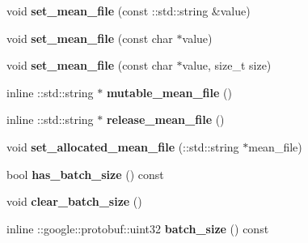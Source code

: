 \begin{DoxyCompactItemize}
void {\bfseries set\+\_\+mean\+\_\+file} (const \+::std\+::string \&value)
\item 
\mbox{\label{classcaffe_1_1_window_data_parameter_adab404354246c1e79c2add34e90f9be3}} 
void {\bfseries set\+\_\+mean\+\_\+file} (const char $\ast$value)
\item 
\mbox{\label{classcaffe_1_1_window_data_parameter_a4b9e39b7f059923169eda02f8f4d3728}} 
void {\bfseries set\+\_\+mean\+\_\+file} (const char $\ast$value, size\+\_\+t size)
\item 
\mbox{\label{classcaffe_1_1_window_data_parameter_a7608286966684195ce7e503eda4e08ae}} 
inline \+::std\+::string $\ast$ {\bfseries mutable\+\_\+mean\+\_\+file} ()
\item 
\mbox{\label{classcaffe_1_1_window_data_parameter_a02f31bb81674de749a560df6c3862b2b}} 
inline \+::std\+::string $\ast$ {\bfseries release\+\_\+mean\+\_\+file} ()
\item 
\mbox{\label{classcaffe_1_1_window_data_parameter_aab23dd0b26ee9fe8eda6c30b566ebc41}} 
void {\bfseries set\+\_\+allocated\+\_\+mean\+\_\+file} (\+::std\+::string $\ast$mean\+\_\+file)
\item 
\mbox{\label{classcaffe_1_1_window_data_parameter_aed7ed6fed5132277bc4b3409b6e1a699}} 
bool {\bfseries has\+\_\+batch\+\_\+size} () const
\item 
\mbox{\label{classcaffe_1_1_window_data_parameter_a6ad4ba690c53a864653eebb4356ec488}} 
void {\bfseries clear\+\_\+batch\+\_\+size} ()
\item 
\mbox{\label{classcaffe_1_1_window_data_parameter_a06dd217fb9ec6d1fa18ee6141e910a23}} 
inline \+::google\+::protobuf\+::uint32 {\bfseries batch\+\_\+size} () const
\item 
\mbox{\label{classcaffe_1_1_window_data_parameter_a3acf60fedd007a2537f0588ff9f275c7}} 

\end{DoxyCompactItemize}

